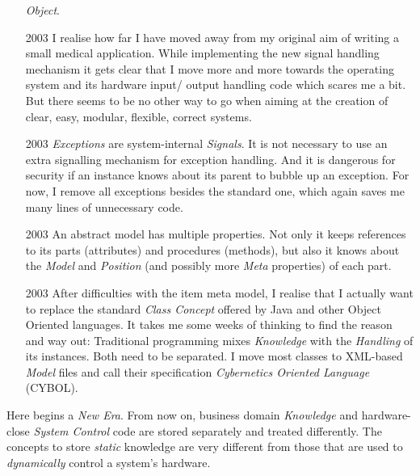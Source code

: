 \begin{itemize}
        \emph{Object}.
    \item[2003] I realise how far I have moved away from my original aim of
        writing a small medical application. While implementing the new signal
        handling mechanism it gets clear that I move more and more towards the
        operating system and its hardware input/ output handling code which
        scares me a bit. But there seems to be no other way to go when aiming
        at the creation of clear, easy, modular, flexible, correct systems.
    \item[2003] \emph{Exceptions} are system-internal \emph{Signals}. It is not
        necessary to use an extra signalling mechanism for exception handling.
        And it is dangerous for security if an instance knows about its parent
        to bubble up an exception. For now, I remove all exceptions besides the
        standard one, which again saves me many lines of unnecessary code.
    \item[2003] An abstract model has multiple properties. Not only it keeps
        references to its parts (attributes) and procedures (methods), but also
        it knows about the \emph{Model} and \emph{Position} (and possibly more
        \emph{Meta} properties) of each part.
    \item[2003] After difficulties with the item meta model, I realise that I
        actually want to replace the standard \emph{Class Concept} offered by
        Java and other Object Oriented languages. It takes me some weeks of
        thinking to find the reason and way out: Traditional programming mixes
        \emph{Knowledge} with the \emph{Handling} of its instances. Both need
        to be separated. I move most classes to XML-based \emph{Model} files and
        call their specification \emph{Cybernetics Oriented Language} (CYBOL).
\end{itemize}

Here begins a \emph{New Era}. From now on, business domain \emph{Knowledge}
and hardware-close \emph{System Control} code are stored separately and treated
differently. The concepts to store \emph{static} knowledge are very different
from those that are used to \emph{dynamically} control a system's hardware.

